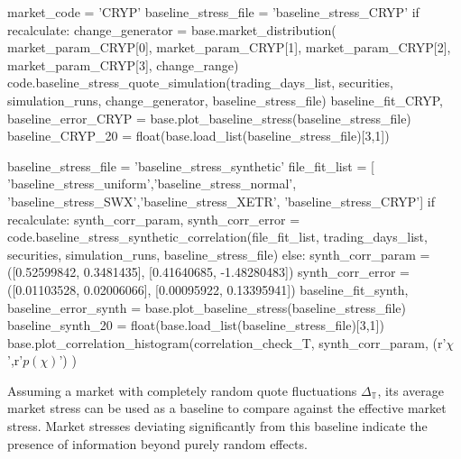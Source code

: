\documentclass[11pt,twoside,a4paper]{article}
\numberwithin{equation}{section}
\numberwithin{figure}{section}
\numberwithin{table}{section}
\begin{document}
\begin{pycode}
market_code = 'CRYP'
baseline_stress_file = 'baseline_stress_CRYP'
if recalculate:
	change_generator = base.market_distribution(
        market_param_CRYP[0], market_param_CRYP[1], market_param_CRYP[2], market_param_CRYP[3], change_range)
	code.baseline_stress_quote_simulation(trading_days_list, securities, simulation_runs, change_generator, baseline_stress_file)
baseline_fit_CRYP,  baseline_error_CRYP = base.plot_baseline_stress(baseline_stress_file)
baseline_CRYP_20 = float(base.load_list(baseline_stress_file)[3,1])

baseline_stress_file = 'baseline_stress_synthetic'
file_fit_list = [
	'baseline_stress_uniform','baseline_stress_normal',
	'baseline_stress_SWX','baseline_stress_XETR', 'baseline_stress_CRYP']
if recalculate:
	synth_corr_param, synth_corr_error = code.baseline_stress_synthetic_correlation(file_fit_list, trading_days_list, securities, simulation_runs, baseline_stress_file)
else:
	synth_corr_param = ([0.52599842, 0.3481435], [0.41640685, -1.48280483])
	synth_corr_error = ([0.01103528, 0.02006066], [0.00095922, 0.13395941])
baseline_fit_synth,  baseline_error_synth = base.plot_baseline_stress(baseline_stress_file)
baseline_synth_20 = float(base.load_list(baseline_stress_file)[3,1])
base.plot_correlation_histogram(correlation_check_T, synth_corr_param, (r'$\chi$',r'$p(\chi)$') )
\end{pycode}
Assuming a market with completely random quote fluctuations $\Delta_\mathbb{T}$, its average market stress can be used as a baseline to compare against the effective market stress. Market stresses deviating significantly from this baseline indicate the presence of information beyond purely random effects.\\
\end{document}
